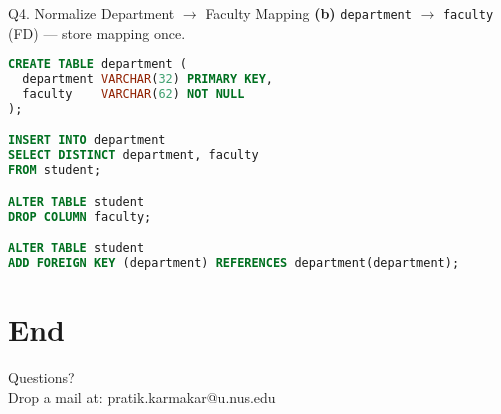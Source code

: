 \documentclass{beamer}
\begin{document}
\begin{frame}[fragile]{Q4. Normalize Department \texorpdfstring{$\to$}{->} Faculty Mapping}
\textbf{(b)} \texttt{department} $\to$ \texttt{faculty} (FD) — store mapping once.
\begin{lstlisting}[language=SQL]
CREATE TABLE department (
  department VARCHAR(32) PRIMARY KEY,
  faculty    VARCHAR(62) NOT NULL
);

INSERT INTO department
SELECT DISTINCT department, faculty
FROM student;

ALTER TABLE student
DROP COLUMN faculty;

ALTER TABLE student
ADD FOREIGN KEY (department) REFERENCES department(department);
\end{lstlisting}
\end{frame}

\section*{End}
\begin{frame}
\begin{center}
Questions?\\
Drop a mail at: pratik.karmakar@u.nus.edu
\end{center}
\end{frame}
\end{document}
